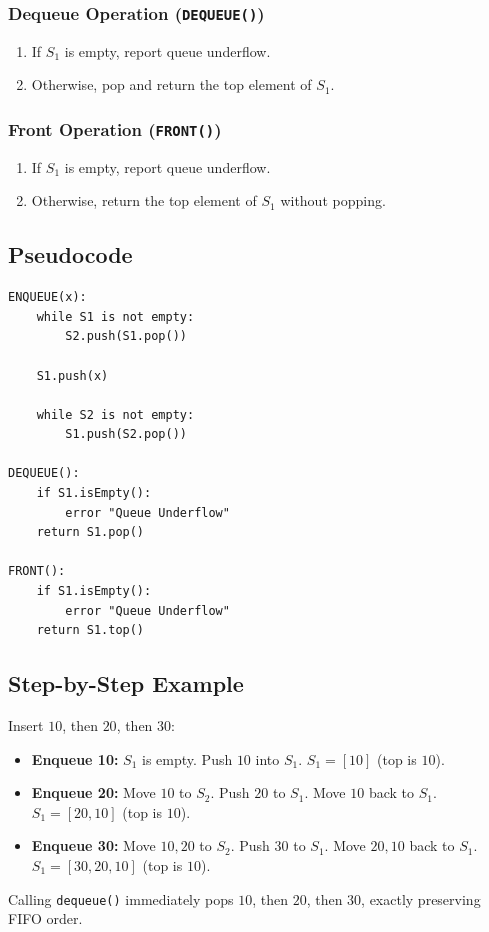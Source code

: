 \subsubsection{Dequeue Operation (\texttt{DEQUEUE()})}
\begin{enumerate}
    \item If $S_1$ is empty, report queue underflow.
    \item Otherwise, pop and return the top element of $S_1$.
\end{enumerate}

\subsubsection{Front Operation (\texttt{FRONT()})}
\begin{enumerate}
    \item If $S_1$ is empty, report queue underflow.
    \item Otherwise, return the top element of $S_1$ without popping.
\end{enumerate}

\subsection{Pseudocode}

\begin{lstlisting}[style=pseudocode]
ENQUEUE(x):
    while S1 is not empty:
        S2.push(S1.pop())
    
    S1.push(x)
    
    while S2 is not empty:
        S1.push(S2.pop())

DEQUEUE():
    if S1.isEmpty():
        error "Queue Underflow"
    return S1.pop()

FRONT():
    if S1.isEmpty():
        error "Queue Underflow"
    return S1.top()
\end{lstlisting}

\subsection{Step-by-Step Example}
Insert $10$, then $20$, then $30$:
\begin{itemize}
    \item \textbf{Enqueue 10:} $S_1$ is empty. Push $10$ into $S_1$. $S_1 = [10]$ (top is $10$).
    \item \textbf{Enqueue 20:} Move $10$ to $S_2$. Push $20$ to $S_1$. Move $10$ back to $S_1$. $S_1 = [20, 10]$ (top is $10$).
    \item \textbf{Enqueue 30:} Move $10, 20$ to $S_2$. Push $30$ to $S_1$. Move $20, 10$ back to $S_1$. $S_1 = [30, 20, 10]$ (top is $10$).
\end{itemize}
Calling \texttt{dequeue()} immediately pops $10$, then $20$, then $30$, exactly preserving FIFO order.

